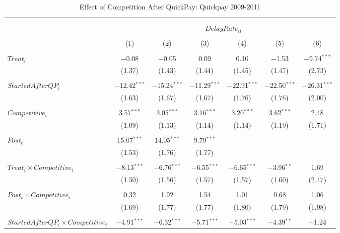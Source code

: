 \documentclass[
]{article}
\begin{document}
\begin{table}[H] \centering 
  \caption{Effect of Competition After QuickPay: Quickpay 2009-2011} 
  \label{} 
\small 
\begin{tabular}{@{\extracolsep{-3pt}}lcccccc} 
\\[-1.8ex]\hline 
\hline \\[-1.8ex] 
\\[-1.8ex] & \multicolumn{6}{c}{$DelayRate_{it}$  } \\ 
\\[-1.8ex] & (1) & (2) & (3) & (4) & (5) & (6)\\ 
\hline \\[-1.8ex] 
 $Treat_i$ & $-$0.08 & $-$0.05 & 0.09 & 0.10 & $-$1.53 & $-$9.74$^{***}$ \\ 
  & (1.37) & (1.43) & (1.44) & (1.45) & (1.47) & (2.73) \\ 
  & & & & & & \\ 
 $StartedAfterQP_i$ & $-$12.42$^{***}$ & $-$15.24$^{***}$ & $-$11.29$^{***}$ & $-$22.91$^{***}$ & $-$22.50$^{***}$ & $-$26.31$^{***}$ \\ 
  & (1.63) & (1.67) & (1.67) & (1.76) & (1.76) & (2.00) \\ 
  & & & & & & \\ 
 $Competitive_i$ & 3.57$^{***}$ & 3.05$^{***}$ & 3.16$^{***}$ & 3.20$^{***}$ & 3.62$^{***}$ & 2.48 \\ 
  & (1.09) & (1.13) & (1.14) & (1.14) & (1.19) & (1.71) \\ 
  & & & & & & \\ 
 $Post_t$ & 15.07$^{***}$ & 14.05$^{***}$ & 9.79$^{***}$ &  &  &  \\ 
  & (1.53) & (1.76) & (1.77) &  &  &  \\ 
  & & & & & & \\ 
 $Treat_i \times Competitive_i$ & $-$8.13$^{***}$ & $-$6.76$^{***}$ & $-$6.55$^{***}$ & $-$6.65$^{***}$ & $-$3.96$^{**}$ & 1.69 \\ 
  & (1.50) & (1.56) & (1.57) & (1.57) & (1.60) & (2.47) \\ 
  & & & & & & \\ 
 $Post_t \times Competitive_i$ & 0.32 & 1.92 & 1.54 & 1.01 & 0.68 & 1.06 \\ 
  & (1.69) & (1.77) & (1.77) & (1.80) & (1.79) & (1.98) \\ 
  & & & & & & \\ 
 $StartedAfterQP_i \times Competitive_i$ & $-$4.91$^{***}$ & $-$6.32$^{***}$ & $-$5.71$^{***}$ & $-$5.03$^{***}$ & $-$4.39$^{**}$ & $-$1.24 \\ 

\end{tabular}
\end{table}
\end{document}
